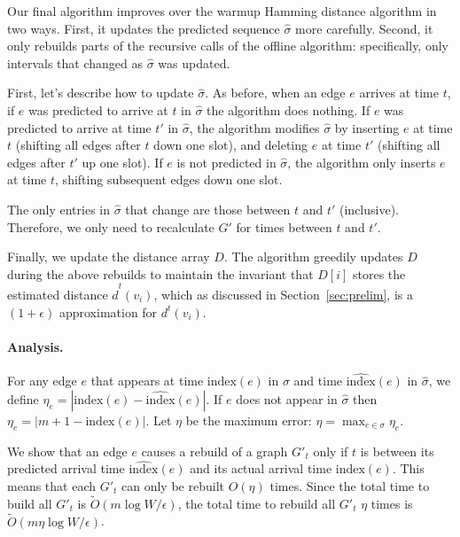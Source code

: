 \documentclass[11pt]{article}
\newcommand{\ind}{\text{index}}
\begin{document}
Our final algorithm improves over the warmup Hamming distance algorithm in two ways.  First, it updates the predicted sequence $\hat{\sigma}$ more carefully.  Second, it only rebuilds parts of the recursive calls of the offline algorithm: specifically, only intervals that changed as $\hat{\sigma}$ was updated.

First, let's describe how to update $\hat{\sigma}$.  As before, when an edge $e$ arrives at time $t$, if $e$ was predicted to arrive at $t$ in $\hat{\sigma}$ the algorithm does nothing.  
If $e$ was predicted to arrive at time $t'$ in $\hat{\sigma}$, the algorithm modifies $\hat{\sigma}$ by inserting $e$ at time $t$ (shifting all edges after $t$ down one slot), and deleting $e$ at time $t'$ (shifting all edges after $t'$ up one slot).
If $e$ is not predicted in $\hat{\sigma}$, the algorithm only inserts $e$ at time $t$, shifting subsequent edges down one slot.

The only entries in $\hat{\sigma}$ that change are those between $t$ and $t'$ (inclusive).  Therefore, we only need to recalculate $G'$ for times between $t$ and $t'$.  

Finally, we update the distance array $D$.  The algorithm greedily updates $D$ during the above rebuilds to maintain the invariant that $D[i]$ stores the estimated distance $\hat{d}^t(v_i)$, which as discussed in Section~\ref{sec:prelim}, is a $(1+\epsilon)$ approximation for $d^t(v_i)$.

\paragraph{Analysis.}
For any edge $e$ that appears at time $\ind(e)$ in $\sigma$ and time $\widehat{\ind}(e)$ in $\hat{\sigma}$, we define $\eta_e = |\ind(e) - \widehat{\ind}(e)|$.  If $e$ does not appear in $\hat{\sigma}$ then $\eta_e = |m+1-\ind(e)|$.
Let $\eta$ be the maximum error: $\eta = \max_{e \in \sigma} \eta_e$.
 
We show that an edge $e$ causes a rebuild of a graph $G'_t$ only if $t$ is between its predicted arrival time $\widehat{\ind}(e)$ and its actual arrival time $\ind(e)$. 
This means that each $G'_t$ can only be rebuilt $O(\eta)$ times.  Since the total time to build all $G'_t$ is $\tilde{O}(m \log W/\epsilon)$, the total time to rebuild all $G'_t$ $\eta$ times is $\tilde{O}(m\eta\log W/\epsilon)$.
\end{document}
